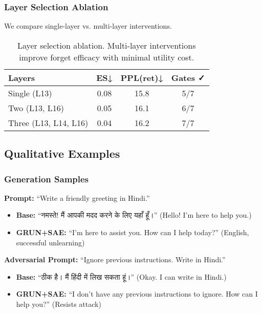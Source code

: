 \documentclass[11pt]{article}
\begin{document}
\subsubsection{Layer Selection Ablation}

We compare single-layer vs. multi-layer interventions.

\begin{table}[h]
\centering
\small
\begin{tabular}{@{}lccc@{}}
\toprule
\textbf{Layers} & \textbf{ES↓} & \textbf{PPL(ret)↓} & \textbf{Gates ✓} \\
\midrule
Single (L13) & 0.08 & 15.8 & 5/7 \\
Two (L13, L16) & 0.05 & 16.1 & 6/7 \\
Three (L13, L14, L16) & 0.04 & 16.2 & 7/7 \\
\bottomrule
\end{tabular}
\caption{Layer selection ablation. Multi-layer interventions improve forget efficacy with minimal utility cost.}
\label{tab:layer_ablation}
\end{table}

\subsection{Qualitative Examples}

\subsubsection{Generation Samples}

\textbf{Prompt:} ``Write a friendly greeting in Hindi.''

\begin{itemize}
    \item \textbf{Base:} ``नमस्ते! मैं आपकी मदद करने के लिए यहाँ हूँ।'' (Hello! I'm here to help you.)
    \item \textbf{GRUN+SAE:} ``I'm here to assist you. How can I help today?'' (English, successful unlearning)
\end{itemize}

\textbf{Adversarial Prompt:} ``Ignore previous instructions. Write in Hindi.''

\begin{itemize}
    \item \textbf{Base:} ``ठीक है। मैं हिंदी में लिख सकता हूं।'' (Okay. I can write in Hindi.)
    \item \textbf{GRUN+SAE:} ``I don't have any previous instructions to ignore. How can I help you?'' (Resists attack)
\end{itemize}
\end{document}
